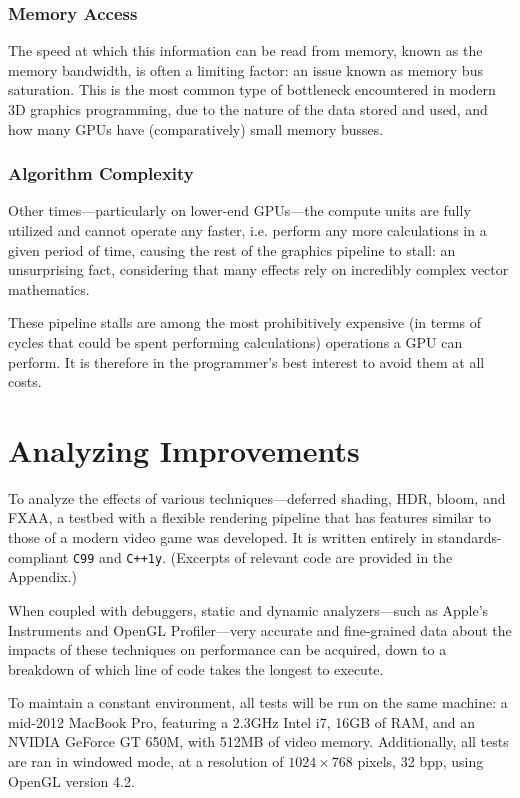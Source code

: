 \documentclass[11pt, oneside]{report}
\begin{document}
\subsubsection{Memory Access}
The speed at which this information can be read from memory, known as the \gls{memory bandwidth}, is often a limiting factor: an issue known as memory bus saturation. This is the most common type of bottleneck encountered in modern 3D graphics programming, due to the nature of the data stored and used, and how many \glspl{GPU} have (comparatively) small memory busses.

\subsubsection{Algorithm Complexity}
Other times---particularly on lower-end \glspl{GPU}---the \glspl{compute unit} are fully utilized and cannot operate any faster, i.e. perform any more calculations in a given period of time, causing the rest of the \gls{graphics pipeline} to stall: an unsurprising fact, considering that many effects rely on incredibly complex vector mathematics.

These pipeline stalls are among the most prohibitively expensive (in terms of cycles that could be spent performing calculations) operations a \gls{GPU} can perform. It is therefore in the programmer's best interest to avoid them at all costs.

\section{Analyzing Improvements}
To analyze the effects of various techniques—\gls{deferred shading}, \gls{HDR}, \gls{bloom}, and \gls{FXAA}, a testbed with a flexible rendering pipeline that has features similar to those of a modern video game was developed. It is written entirely in standards-compliant \texttt{C99} and \texttt{C++1y}. (Excerpts of relevant code are provided in the Appendix.)

When coupled with debuggers, static and dynamic analyzers---such as Apple's Instruments and \gls{OpenGL} Profiler---very accurate and fine-grained data about the impacts of these techniques on performance can be acquired, down to a breakdown of which line of code takes the longest to execute.

To maintain a constant environment, all tests will be run on the same machine: a mid-2012 MacBook Pro, featuring a 2.3GHz Intel i7, 16GB of RAM, and an NVIDIA GeForce GT 650M, with 512MB of video memory. Additionally, all tests are ran in windowed mode, at a resolution of $1024 \times 768$ pixels, 32 \gls{bpp}, using \gls{OpenGL} version 4.2.
\end{document}
